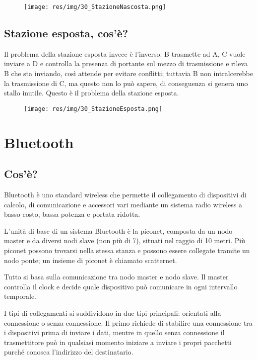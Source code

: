 \begin{figure}[H]
\centering
\texttt{[image: res/img/30\_StazioneNascosta.png]}
\end{figure} 

\subsection{Stazione esposta, cos'è?}

Il problema della stazione esposta invece è l'inverso. B trasmette ad A, C vuole inviare a D e controlla la presenza di portante sul mezzo di trasmissione e rileva B che sta inviando, così attende per evitare conflitti; tuttavia B non intralcerebbe la trasmissione di C, ma questo non lo può sapere, di conseguenza si genera uno stallo inutile. Questo è il problema della stazione esposta.
 
 \begin{figure}[H]
\centering
\texttt{[image: res/img/30\_StazioneEsposta.png]}
\end{figure} 

\section{Bluetooth}
\subsection{Cos'è?}
Bluetooth è uno standard wireless che permette il collegamento di dispositivi di calcolo, di comunicazione e accessori vari mediante un sistema radio wireless a basso costo, bassa potenza e portata ridotta.

L'unità di base di un sistema Bluetooth è la piconet, composta da un nodo master e da diversi nodi slave (non più di 7), situati nel raggio di 10 metri. Più piconet possono trovarsi nella stessa stanza e possono essere collegate tramite un nodo ponte; un insieme di piconet è chiamato scatternet.

Tutto si basa sulla comunicazione tra nodo master e nodo slave. Il master controlla il clock e decide quale dispositivo può comunicare in ogni intervallo temporale.

I tipi di collegamenti si suddividono in due tipi principali: orientati alla connessione o senza connessione.
Il primo richiede di stabilire una connessione tra i dispositivi prima di inviare i dati, mentre in quello senza connessione il trasmettitore può in qualsiasi momento iniziare a inviare i propri pacchetti purché conosca l'indirizzo del destinatario.

